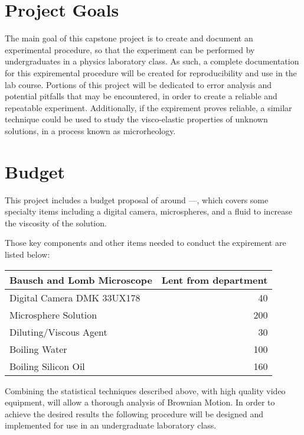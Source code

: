 \documentclass[aps,prb,twocolumn,groupedaddress,nofootinbib,floatfix]{revtex4}
\begin{document}
\section*{Project Goals}	
The main goal of this capstone project is to create and document an experimental procedure, so that the experiment can be performed by undergraduates in a physics laboratory class. As such, a complete documentation for this expiremental procedure will be created for reproducibility and use in the lab course. Portions of this project will be dedicated to error analysis and potential pitfalls that may be encountered, in order to create a reliable and repeatable experiment. Additionally, if the expirement proves reliable, a similar technique could be used to study the visco-elastic properties of unknown solutions, in a process known as microrheology. 

\section*{Budget}
This project includes a budget proposal of around ---, which covers some specialty items including a digital camera, microspheres, and a fluid to increase the viscosity of the solution. 

Those key components and other items needed to conduct the expirement are listed below:

 \begin{tabular}{|l|r|}
\hline
  Bausch and Lomb Microscope & Lent from department\\ \hline

  Digital Camera DMK 33UX178 & 40 \\ \hline
  
  Microsphere Solution & 200  \\ \hline
 
  Diluting/Viscous Agent & 30  \\ \hline
  \hline
   Boiling Water & 100 \\ \hline
  \hline
   Boiling Silicon Oil & 160 \\ \hline
  \hline
\end{tabular}





Combining the statistical techniques described above, with high quality video equipment, will allow a thorough analysis of Brownian Motion. In order to achieve the desired results the following procedure will be designed and implemented for use in an undergraduate laboratory class. 
\end{document}
